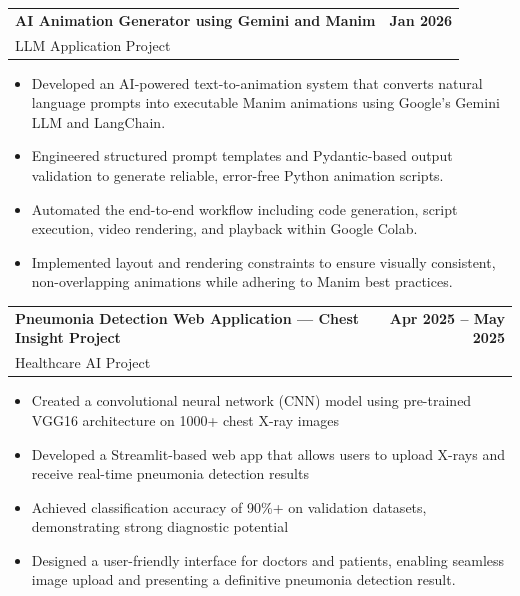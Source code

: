 \documentclass[letterpaper,11pt]{article}
\makeatletter
\newcommand{\resumeItem}[1]{
  \item\small{#1 \vspace{3pt}}   %
}
\newcommand{\resumeSubheading}[4]{
  \vspace{-2pt}\item
    \begin{tabular*}{1.0\textwidth}[t]{l@{\extracolsep{\fill}}r}
      \textbf{#1} & \textbf{\small #2} \\
      {\small #3} & {\small #4} \\
    \end{tabular*}\vspace{-3pt}
}
\newcommand{\resumeItemListStart}{\begin{itemize}[leftmargin=0.15in, itemsep=3pt]}   %
\newcommand{\resumeItemListEnd}{\end{itemize}\vspace{2pt}}  %
\makeatother
\begin{document}
\resumeSubheading
     {AI Animation Generator using Gemini and Manim}{Jan 2026}
  {LLM Application Project}{}
  \vspace{-3pt}
  \resumeItemListStart
    \resumeItem{Developed an AI-powered text-to-animation system that converts natural language prompts into executable Manim animations using Google's Gemini LLM and LangChain. } \vspace{-1pt}
    \resumeItem{Engineered structured prompt templates and Pydantic-based output validation to generate reliable, error-free Python animation scripts. } \vspace{-1pt} 
    \resumeItem{Automated the end-to-end workflow including code generation, script execution, video rendering, and playback within Google Colab.} \vspace{-1pt}
    \resumeItem{Implemented layout and rendering constraints to ensure visually consistent, non-overlapping animations while adhering to Manim best practices.} \vspace{-3pt}
  \resumeItemListEnd
  \vspace{-6pt}
    

\resumeSubheading
    {Pneumonia Detection Web Application — Chest Insight Project}{Apr 2025 -- May 2025}
    {Healthcare AI Project}{}
    \vspace{-3pt}
    \resumeItemListStart
      \resumeItem{Created  a convolutional neural network (CNN) model using pre-trained VGG16 architecture on 1000+ chest X-ray images} \vspace{-1pt}
      \resumeItem{Developed a Streamlit-based web app that allows users to upload X-rays and receive real-time pneumonia detection results} \vspace{-1pt}
      \resumeItem{Achieved classification accuracy of 90\%+ on validation datasets, demonstrating strong diagnostic potential} \vspace{-1pt}
      \resumeItem{Designed a user-friendly interface for doctors and patients, enabling seamless image upload and presenting a definitive pneumonia detection result.} \vspace{-4pt}
      
    \resumeItemListEnd
      \vspace{-3pt}
\end{document}

